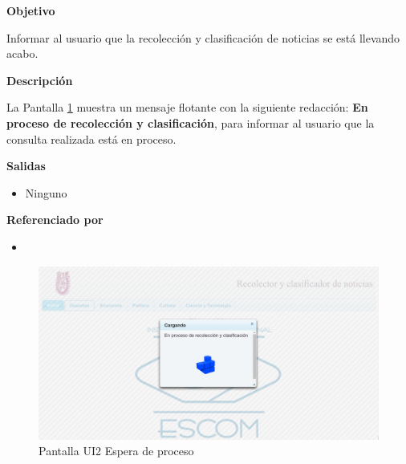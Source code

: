 \begin{large}
  \textbf{Objetivo}\\
\end{large}


Informar al usuario que la recolección y clasificación de noticias se está llevando acabo.\\

\begin{large}
  \textbf{Descripción}\\
\end{large}

La Pantalla \ref{fig:UI2} muestra un mensaje flotante con la siguiente redacción: \textbf{En proceso de recolección y clasificación}, para informar al usuario que la consulta realizada está en proceso.\\

\begin{large}
  \textbf{Salidas}
\end{large}

\begin{itemize}

  \item Ninguno

\end{itemize}



\begin{large}
  \textbf{Referenciado por}
\end{large}

\begin{itemize}

  \item {}

\end{itemize}  



\begin{figure}
  \centering 
	\includegraphics[scale=.32]{imagenes/Pantallas/UI2}
  \caption{Pantalla UI2 Espera de proceso}
  \label{fig:UI2}
\end{figure}
